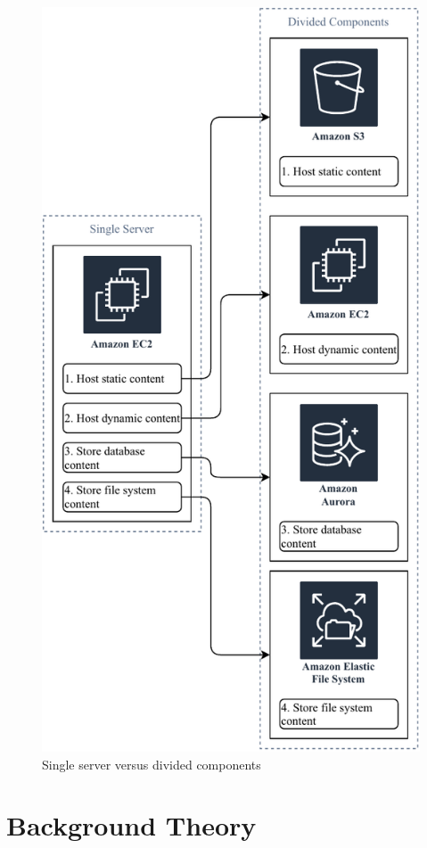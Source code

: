 \documentclass{home_assignment}
\begin{document}
    \begin{figure}[H]
        \centering
        \includegraphics{../Figures/single_vs_ref}
        \caption{Single server versus divided components}
        \label{fig:single_vs_ref}
    \end{figure}
    \section{Background Theory}
\end{document}
